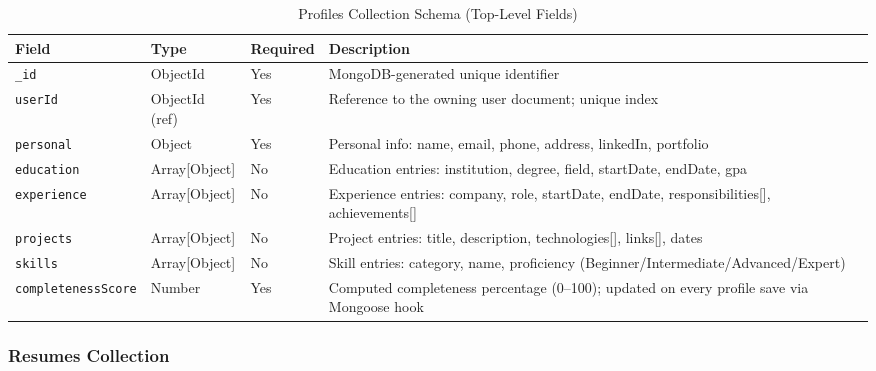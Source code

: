 \documentclass[12pt, a4paper, oneside]{report}
\begin{document}
\begin{table}[H]
\centering
\caption{Profiles Collection Schema (Top-Level Fields)}
\label{tab:schema_profiles}
\renewcommand{\arraystretch}{1.4}
\begin{tabularx}{\textwidth}{|p{3.5cm}|p{2.5cm}|p{1.5cm}|X|}
\hline
\textbf{Field} & \textbf{Type} & \textbf{Required} & \textbf{Description} \\
\hline
\texttt{\_id} & ObjectId & Yes & MongoDB-generated unique identifier \\
\hline
\texttt{userId} & ObjectId (ref) & Yes & Reference to the owning user document; unique index \\
\hline
\texttt{personal} & Object & Yes & Personal info: name, email, phone, address, linkedIn, portfolio \\
\hline
\texttt{education} & Array[Object] & No & Education entries: institution, degree, field, startDate, endDate, gpa \\
\hline
\texttt{experience} & Array[Object] & No & Experience entries: company, role, startDate, endDate, responsibilities[], achievements[] \\
\hline
\texttt{projects} & Array[Object] & No & Project entries: title, description, technologies[], links[], dates \\
\hline
\texttt{skills} & Array[Object] & No & Skill entries: category, name, proficiency (Beginner/Intermediate/Advanced/Expert) \\
\hline
\texttt{completenessScore} & Number & Yes & Computed completeness percentage (0--100); updated on every profile save via Mongoose hook \\
\hline
\end{tabularx}
\end{table}

\subsubsection{Resumes Collection}
\end{document}
